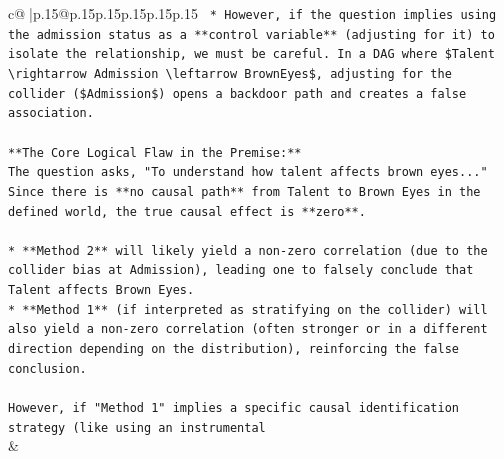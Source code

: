 \documentclass{article}
\begin{document}
{\begin{supertabular}{c@{$\;$}|p{.15\linewidth}@{}p{.15\linewidth}p{.15\linewidth}p{.15\linewidth}p{.15\linewidth}p{.15\linewidth}}
{{{\texttt{    *   However, if the question implies using the admission status as a **control variable** (adjusting for it) to isolate the relationship, we must be careful. In a DAG where \$Talent \textbackslash{}rightarrow Admission \textbackslash{}leftarrow BrownEyes\$, adjusting for the collider (\$Admission\$) opens a backdoor path and creates a false association.} \\
\\ 
\texttt{**The Core Logical Flaw in the Premise:**} \\
\texttt{The question asks, "To understand how talent affects brown eyes..."} \\
\texttt{Since there is **no causal path** from Talent to Brown Eyes in the defined world, the true causal effect is **zero**.} \\
\\ 
\texttt{*   **Method 2** will likely yield a non{-}zero correlation (due to the collider bias at Admission), leading one to falsely conclude that Talent affects Brown Eyes.} \\
\texttt{*   **Method 1** (if interpreted as stratifying on the collider) will also yield a non{-}zero correlation (often stronger or in a different direction depending on the distribution), reinforcing the false conclusion.} \\
\\ 
\texttt{However, if "Method 1" implies a specific causal identification strategy (like using an instrumental} \\
            }
        }
    }
    & \\ \\


\end{supertabular}}
\end{document}
